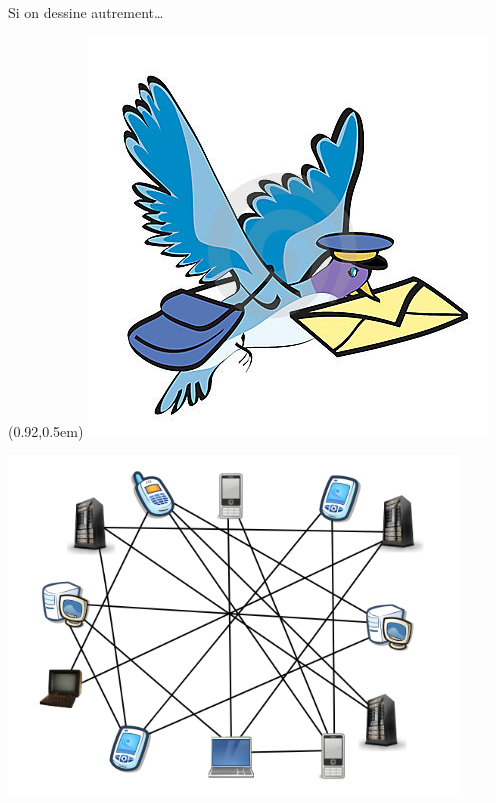 \begin{frame}{Si on dessine autrement…}
  \begin{textblock*}{0.28\textwidth}(0.92\textwidth,0.5em)
    \includegraphics[width=\textwidth]{concepts/rfc1149.png}
  \end{textblock*}
  \includegraphics[width=0.9\textwidth]{concepts/reseau-bazar.png}
\end{frame}
